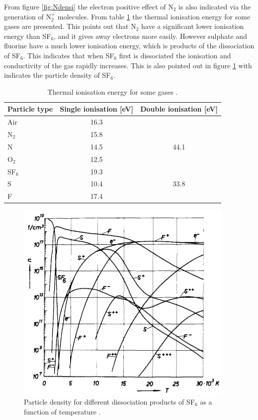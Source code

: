 \documentclass[10pt,a4paper]{article} %
\begin{document}
From figure \ref{fig:Ndensi} the electron positive effect of N$_2$ is also indicated via the generation of N$_{2}^{+}$ molecules. From table \ref{tab:thermalIonisation} the thermal ionisation energy for some gases are presented. This points out that N$_2$ have a significant lower ionisation energy than SF$_6$, and it gives away electrons more easily. However sulphate and fluorine have a much lower ionisation energy, which is products of the dissociation of SF$_6$. This indicates that when SF$_6$ first is dissociated the ionisation and conductivity of the gas rapidly increases. This is also pointed out in figure \ref{fig:SF6densi} with indicates the particle density of SF$_6$.

\begin{table}[H]
\center
\caption{Thermal ionisation energy for some gases \cite{bib:HVEbreak}.}
\begin{tabular}{|l|c|c|}
\hline 
Particle type & Single ionisation [eV] & Double ionisation [eV] \\ 
\hline 
Air & 16.3 &  \\ 
\hline 
N$_2$ & 15.8 &  \\ 
\hline 
N & 14.5 & 44.1 \\ 
\hline 
O$_2$ & 12.5 &  \\ 
\hline 
SF$_6$ & 19.3 &  \\ 
\hline 
S & 10.4 & 33.8 \\ 
\hline 
F & 17.4 &  \\ 
\hline 
\end{tabular} 
\label{tab:thermalIonisation}
\end{table}

\begin{figure}[H]
\centering
\includegraphics[scale=0.5]{Bilder/Theory/particleDensSF6.png}
\caption{Particle density for different dissociation products of SF$_6$ as a function of temperature \cite{bib:IPSF6AQM}.} \label{fig:SF6densi}
\end{figure}
\end{document}
